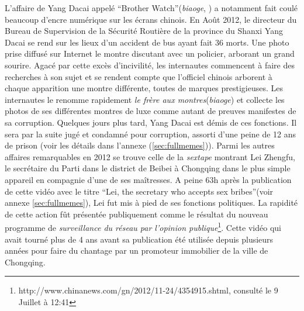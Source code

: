 L'affaire de Yang Dacai appelé ``Brother Watch''(\textit{biaoge}, ) a notamment fait coulé beaucoup d'encre numérique sur les écrans chinois. En Août 2012, le directeur du  Bureau de Supervision de la Sécurité Routière de la province du Shanxi Yang Dacai se rend sur les lieux d'un accident de bus ayant fait 36 morts. Une photo prise diffusé sur Internet le montre discutant avec un policier, arborant un grand sourire. Agacé par cette excès d'incivilité, les internautes commencent à faire des recherches à son sujet et se rendent compte que l'officiel chinois arborent à chaque apparition une montre différente, toutes de marques prestigieuses. Les internautes le renomme rapidement \textit{le frère aux montres}(\textit{biaoge}) et collecte les photos de ses différentes montres de luxe comme autant de preuves manifestes de sa corruption. Quelques jours plus tard, Yang Dacai est démis de ces fonctions. Il sera par la suite jugé et condamné pour corruption, assorti d'une peine de 12 ans de prison (voir les détails dans l'annexe (\ref{sec:fullmemes})). Parmi les autres affaires remarquables en 2012 se trouve celle de la \textit{sextape} montrant Lei Zhengfu, le secrétaire du Parti dans le district de Beibei à Chongqing dans le plus simple appareil en compagnie d'une de ses maîtresses. A peine 63h après la publication de cette vidéo avec le titre ``Lei, the secretary who accepts sex bribes''(voir annexe \ref{sec:fullmemes}), Lei fut mis à pied de ses fonctions politiques. La rapidité de cette action fût présentée publiquement comme le résultat du nouveau programme de \textit{surveillance du réseau par l'opinion publique}\footnote{http://www.chinanews.com/gn/2012/11-24/4354915.shtml, consulté le 9 Juillet à 12:41
}. Cette vidéo qui avait tourné plus de 4 ans avant sa publication été utilisée depuis plusieurs années pour faire du chantage par un promoteur immobilier de la ville de Chongqing. 


